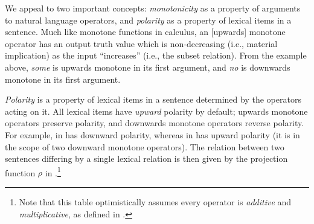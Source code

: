 We appeal to two important concepts: \textit{monotonicity} as a
  property of arguments to natural language operators,
  and \textit{polarity}
  as a property of lexical items in a sentence.
Much like monotone functions in calculus,
  an [upwards] monotone operator has an output truth value which is
  non-decreasing (i.e., material implication)
  as the input ``increases'' (i.e., the subset relation).
From the example above, \textit{some} is upwards monotone in its first
  argument, and \textit{no} is downwards monotone in its first argument.

%

\textit{Polarity} is
  a property of lexical items in a sentence determined by the
  operators acting on it.
All lexical items have \textit{upward} polarity by default;
  upwards monotone operators preserve polarity,
  and downwards monotone operators reverse polarity.
For example,  in  has downward 
  polarity, whereas  in 
  has upward polarity
  (it is in the scope of two downward monotone operators).
The relation between two sentences differing by a single lexical
  relation is then given by the projection function $\rho$ in
  .\footnote{
    Note that this table optimistically assumes every operator is
    \textit{additive} and \textit{multiplicative}, as defined
    in .
  }

